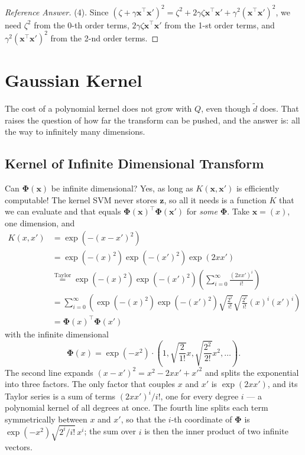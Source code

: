 \begin{proof}[Reference Answer]
    (4). Since \((\zeta + \gamma \bm{x}^\top \bm{x}')^2 = \zeta^2 + 2\gamma
    \zeta \bm{x}^\top \bm{x}' + \gamma^2 (\bm{x}^\top \bm{x}')^2\), we need
    \(\zeta^2\) from the 0-th order terms, \(2\gamma\zeta \bm{x}^\top
    \bm{x}'\) from the 1-st order terms, and \(\gamma^2 (\bm{x}^\top
    \bm{x}')^2\) from the 2-nd order terms.
\end{proof}

\section{Gaussian Kernel}\label{sec:gaussian-kernel}


The cost of a polynomial kernel does not grow with \(Q\), even though
\(\tilde{d}\) does. That raises the question of how far the transform can be
pushed, and the answer is: all the way to infinitely many dimensions.

\subsection{Kernel of Infinite Dimensional Transform}

Can \(\bm{\Phi}(\bm{x})\) be infinite dimensional? Yes, as long as
\(K(\bm{x}, \bm{x}')\) is efficiently computable! The kernel SVM never
stores \(\bm{z}\), so all it needs is a function \(K\) that we can evaluate
and that equals \(\bm{\Phi}(\bm{x})^\top \bm{\Phi}(\bm{x}')\) for
\emph{some} \(\bm{\Phi}\). Take \(\bm{x} = (x)\), one dimension, and
\[
    \begin{aligned}
        K(x, x') &= \exp(-(x - x')^2)\\
        &= \exp(-(x)^2) \exp(-(x')^2) \exp(2xx')\\
        &\overset{\text{Taylor}}{=} \exp(-(x)^2) \exp(-(x')^2) \left(
            \sum_{i=0}^\infty \frac{(2xx')^i}{i!} \right)\\
        &= \sum_{i=0}^\infty \left( \exp(-(x)^2) \exp(-(x')^2)
            \sqrt{\frac{2^i}{i!}} \sqrt{\frac{2^i}{i!}} (x)^i (x')^i
            \right)\\
        &= \bm{\Phi}(x)^\top \bm{\Phi}(x')
    \end{aligned}
\]
with the infinite dimensional
\[
    \bm{\Phi}(x) = \exp(-x^2) \cdot \left( 1, \sqrt{\frac{2}{1!}} x,
    \sqrt{\frac{2^2}{2!}} x^2, \dots \right).
\]
The second line expands \((x - x')^2 = x^2 - 2xx' + x'^2\) and splits the
exponential into three factors. The only factor that couples \(x\) and
\(x'\) is \(\exp(2xx')\), and its Taylor series is a sum of terms
\((2xx')^i / i!\), one for every degree \(i\) --- a polynomial kernel of all
degrees at once. The fourth line splits each term symmetrically between
\(x\) and \(x'\), so that the \(i\)-th coordinate of \(\bm{\Phi}\) is
\(\exp(-x^2) \sqrt{2^i / i!}\, x^i\); the sum over \(i\) is then the inner
product of two infinite vectors.

